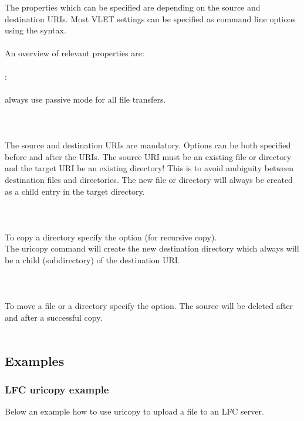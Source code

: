 The properties which can be specified are depending on the source and
destination URIs. Most VLET settings can be specified as command line options 
using the  syntax. \\
\\
An overview of relevant properties are:\\
\\
:\\
\\
\tab {} always use passive mode for all file transfers.\\
\\ 
\\
\\
The source and destination URIs are mandatory. Options can be both specified
before and after the URIs. The source URI must be an existing file or directory
and the target URI  be an existing directory! This is to
avoid ambiguity between destination files and directories. The new file or
directory will always be created as a child entry in the target directory.\\
\\
\\
\\
To copy a directory specify the  option (for recursive copy).\\
The uricopy command will create the new destination directory which
always will be a child (subdirectory) of the destination URI.\\
\\
\\
\\
To move a file or a directory specify the  option. The source will
be deleted after and  after a successful copy. \\
\\

\subsection{Examples} 

\subsubsection{LFC uricopy example}

Below an example how to use uricopy to upload a file to an LFC server. 

